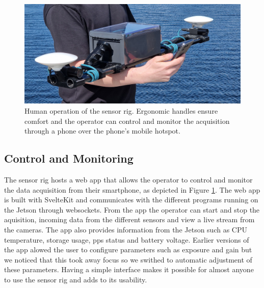 \begin{figure}[H]
    \centering
    \includegraphics[width=\textwidth]{figures/operation.jpg}
    \caption{Human operation of the sensor rig. Ergonomic handles ensure comfort and the operator can control and monitor the acquisition through a phone over the phone's mobile hotspot. \label{fig:operation}}
\end{figure}

\subsection{Control and Monitoring}
The sensor rig hosts a web app that allows the operator to control and monitor the data acquisition from their smartphone, as depicted in Figure \ref{fig:operation}.
The web app is built with SvelteKit and communicates with the different programs running on the Jetson through websockets.
From the app the operator can start and stop the aquisition, incoming data from the different sensors and view a live stream from the cameras.
The app also provides information from the Jetson such as CPU temperature, storage usage, \gls{pps} status and battery voltage.
Earlier versions of the app alowed the user to configure parameters such as exposure and gain but we noticed that this took away focus so we swithed to automatic adjustment of these parameters.
Having a simple interface makes it possible for almost anyone to use the sensor rig and adds to its usability.


